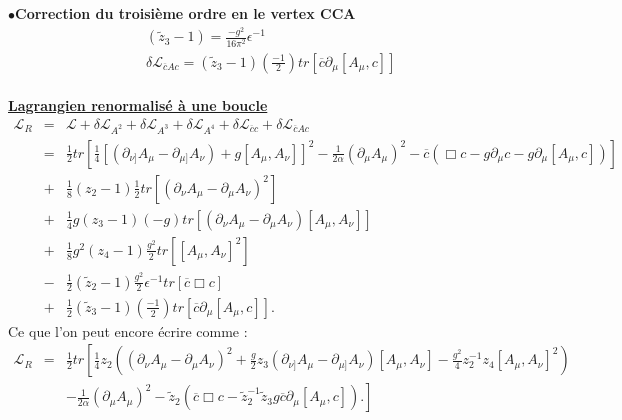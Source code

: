\documentclass[a4paper,11pt]{article}
\theoremstyle{plain}
\theoremstyle{definition}
\theoremstyle{remark}
\numberwithin{equation}{section}
\numberwithin{equation}{subsection}
\numberwithin{figure}{section}
\begin{document}
$\bullet$\hspace{1mm}\textbf{Correction du troisième ordre en le vertex CCA}
\begin{eqnarray}
&&  (\tilde{z}_{3} - 1) =\frac{-g^2}{16 \pi^2} \epsilon^{-1} \\
&& \delta \mathcal{L}_{\overline{c}Ac} =  (\tilde{z}_{3} - 1) ( \frac{-1}{2} ) tr [ \overline{c} \partial_{\mu} [A_{\mu}, c] ]
\end{eqnarray}\\

\vspace{2cm}
\noindent
\underline{\textbf{Lagrangien renormalisé à une boucle}}\\
\begin{eqnarray}
\mathcal{L}_{R} &=& \mathcal{L} + \delta \mathcal{L}_{A^2} +  \delta \mathcal{L}_{A^3} +  \delta \mathcal{L}_{A^4}  
+  \delta \mathcal{L}_{\overline{c}c}  + \delta \mathcal{L}_{\overline{c}Ac}  \\
                              &=&  \frac{1}{2} tr[ \frac{1}{4} [ ( \partial_{\nu]}A_{\mu}- \partial_{\mu]}A_{\nu} ) 
+ g [A_{\mu},A_{\nu}] ]^2 
- \frac{1}{2 \alpha} (\partial_{\mu} A_{\mu} )^2 - \overline{c} ( \Box c - g \partial_{\mu}c - g\partial_{\mu} [A_{\mu},c]) ]  \nonumber  \\
                              &+& \frac{1}{8} (z_{2} - 1) \frac{1}{2} tr [ ( \partial_{\nu} A_{\mu} - \partial_{\mu} A_{\nu} )^2 ] \nonumber \\
                              &+& \frac{1}{4} g  (z_{3} - 1) (-g) 
tr [ ( \partial_{\nu} A_{\mu} - \partial_{\mu} A_{\nu} ) [A_{\mu},A_{\nu}] ] \nonumber \\
                              &+& \frac{1}{8} g^2 (z_{4} - 1) \frac{g^2}{2} tr [ [A_{\mu},A_{\nu}]^2  ] \nonumber \\
                              &-& \frac{1}{2} (\tilde{z}_{2} - 1) \frac{g^{2}}{2}  \epsilon^{-1} tr [ \overline{c} \Box c ] \nonumber \\
                              &+& \frac{1}{2}  (\tilde{z}_{3} - 1) ( \frac{-1}{2} ) tr [ \overline{c} \partial_{\mu} [A_{\mu}, c] ].
\end{eqnarray}
Ce que l'on peut encore écrire comme :
\begin{eqnarray}
\mathcal{L}_{R} &=& \frac{1}{2} tr\left[ \frac{1}{4} z_{2} \left( ( \partial_{\nu}A_{\mu}- \partial_{\mu}A_{\nu} )^2 
+ \frac{g}{2} z_{3} 
( \partial_{\nu]}A_{\mu}- \partial_{\mu]}A_{\nu} ) [A_{\mu},A_{\nu}]  - \frac{g^2}{4} z_{2}^{-1}  z_{4}[A_{\mu},A_{\nu}] ^2 \right) \right. \nonumber \\
  &&\left.  - \frac{1}{2 \alpha} 
(\partial_{\mu} A_{\mu} )^2 - \tilde{z}_{2} \left(\overline{c} \Box c - \tilde{z}_{2}^{-1} \tilde{z}_{3} g \overline{c} \partial_{\mu} [A_{\mu},c] \right). \right]
\end{eqnarray}
\end{document}
